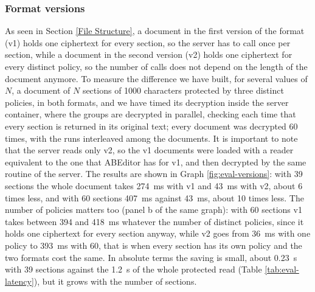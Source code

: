 \subsubsection{Format versions}\label{sec:eval-formats}
As seen in Section \ref{File Structure}, a document in the first version of the format (v1) holds one ciphertext for every section, so the server has to call  once per section, while a document in the second version (v2) holds one ciphertext for every distinct policy, so the number of calls does not depend on the length of the document anymore.
To measure the difference we have built, for several values of $N$, a document of $N$ sections of 1000 characters protected by three distinct policies, in both formats, and we have timed its decryption inside the server container, where the groups are decrypted in parallel, checking each time that every section is returned in its original text; every document was decrypted 60 times, with the runs interleaved among the documents.
It is important to note that the server reads only v2, so the v1 documents were loaded with a reader equivalent to the one that ABEditor has for v1, and then decrypted by the same routine of the server.
The results are shown in Graph \ref{fig:eval-versions}: with 39 sections the whole document takes 274~ms with v1 and 43~ms with v2, about 6 times less, and with 60 sections 407~ms against 43~ms, about 10 times less.
The number of policies matters too (panel b of the same graph): with 60 sections v1 takes between 394 and 418~ms whatever the number of distinct policies, since it holds one ciphertext for every section anyway, while v2 goes from 36~ms with one policy to 393~ms with 60, that is when every section has its own policy and the two formats cost the same.
In absolute terms the saving is small, about 0.23~s with 39 sections against the 1.2~s of the whole protected read (Table \ref{tab:eval-latency}), but it grows with the number of sections.


